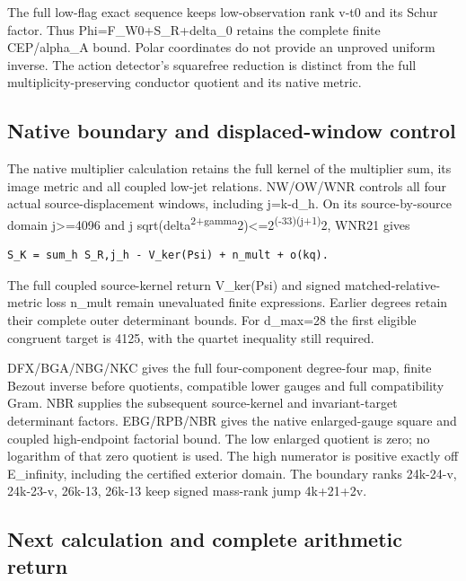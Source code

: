 \documentclass[
]{article}
\begin{document}
The full low-flag exact sequence keeps low-observation rank v-t0 and its
Schur factor. Thus Phi=F\_W0+S\_R+delta\_0 retains the complete finite
CEP/alpha\_A bound. Polar coordinates do not provide an unproved uniform
inverse. The action detector's squarefree reduction is distinct from the
full multiplicity-preserving conductor quotient and its native metric.

\subsection{Native boundary and displaced-window
control}\label{native-boundary-and-displaced-window-control}

The native multiplier calculation retains the full kernel of the
multiplier sum, its image metric and all coupled low-jet relations.
NW/OW/WNR controls all four actual source-displacement windows,
including j=k-d\_h. On its source-by-source domain j\textgreater=4096
and j
sqrt(delta\textsuperscript{2+gamma}2)\textless=2\textsuperscript{(-33)(j+1)}2,
WNR21 gives

\begin{verbatim}
S_K = sum_h S_R,j_h - V_ker(Psi) + n_mult + o(kq).
\end{verbatim}

The full coupled source-kernel return V\_ker(Psi) and signed
matched-relative- metric loss n\_mult remain unevaluated finite
expressions. Earlier degrees retain their complete outer determinant
bounds. For d\_max=28 the first eligible congruent target is 4125, with
the quartet inequality still required.

DFX/BGA/NBG/NKC gives the full four-component degree-four map, finite
Bezout inverse before quotients, compatible lower gauges and full
compatibility Gram. NBR supplies the subsequent source-kernel and
invariant-target determinant factors. EBG/RPB/NBR gives the native
enlarged-gauge square and coupled high-endpoint factorial bound. The low
enlarged quotient is zero; no logarithm of that zero quotient is used.
The high numerator is positive exactly off E\_infinity, including the
certified exterior domain. The boundary ranks 24k-24-v, 24k-23-v,
26k-13, 26k-13 keep signed mass-rank jump 4k+21+2v.

\subsection{Next calculation and complete arithmetic
return}\label{next-calculation-and-complete-arithmetic-return}
\end{document}

